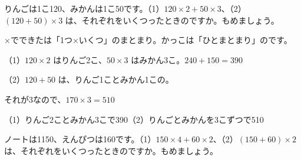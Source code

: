 \begin{reidai}[\R{式}{しき}が\R{表}{あらわ}す\R{場面}{ば|めん}を\R{読}{よ}む]
りんごは1こ120、みかんは1こ50です。（1）$120\times2+50\times3$、（2）$(120+50)\times3$ は、それぞれをいくつったときのですか。もめましょう。\par
\kangaekata ×でできたは「1つ×いくつ」のまとまり。かっこは「ひとまとまり」のです。\par
\shiki（1）$120\times2$ はりんご2こ、$50\times3$ はみかん3こ。$240+150=390$\par
\hspace*{2.6\zw}（2）$120+50$ は、りんご1ことみかん1この。\par
\hspace*{4.6\zw}それが3なので、$170\times3=510$\par
\kotae（1）りんご2ことみかん3こで390\quad（2）りんごとみかんを3こずつで510
\end{reidai}

\begin{jibun}
ノートは1150、えんぴつは160です。（1）$150\times4+60\times2$、（2）$(150+60)\times2$ は、それぞれをいくつったときのですか。もめましょう。
\end{jibun}

